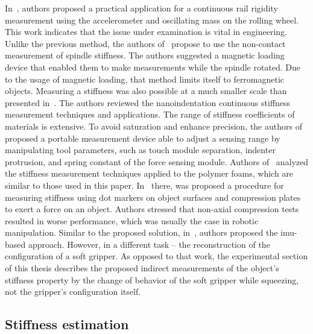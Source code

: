 \documentclass[a4paper, 10pt, twoside]{report}
\begin{document}
In~\cite{rails}, authors proposed a practical application for a continuous rail rigidity measurement using the accelerometer and oscillating mass on the rolling wheel. This work indicates that the issue under examination is vital in engineering. Unlike the previous method, the authors of~\cite{noncontact_stiff} propose to use the non-contact measurement of spindle stiffness. The authors suggested a magnetic loading device that enabled them to make measurements while the spindle rotated. Due to the usage of magnetic loading, that method limits itself to ferromagnetic objects. Measuring a stiffness was also possible at a much smaller scale than presented in~\cite{nano}. The authors reviewed the nanoindentation continuous stiffness measurement techniques and applications. The range of stiffness coefficients of materials is extensive. To avoid saturation and enhance precision, the authors of~\cite{stiff_measurement_system} proposed a portable measurement device able to adjust a sensing range by manipulating tool parameters, such as touch module separation, indenter protrusion, and spring constant of the force sensing module. Authors of~\cite{foams, foams2} analyzed the stiffness measurement techniques applied to the polymer foams, which are similar to those used in this paper. In~\cite{foams} there, was proposed a procedure for measuring stiffness using dot markers on object surfaces and compression plates to exert a force on an object. Authors stressed that non-axial compression tests resulted in worse performance, which was usually the case in robotic manipulation. Similar to the proposed solution, in~\cite{pisa_hand_imu_justification}, authors proposed the \acrshort{imu}-based approach. However, in a different task -- the reconstruction of the configuration of a soft gripper. As opposed to that work, the experimental section of this thesis describes the proposed indirect measurements of the object's stiffness property by the change of behavior of the soft gripper while squeezing, not the gripper's configuration itself.

\subsection{Stiffness estimation}
\label{part:methods:materials:rw:estimation}
\end{document}
